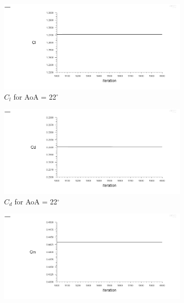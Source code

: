 \begin{figure}[H]
  \begin{subfigure}[b]{0.5\textwidth}
    \includegraphics[width=\textwidth]{22_deg/AoA_22_cl.png}
    \caption{$C_l$ for AoA = 22$^\circ$}
    \label{fig:aoa_22_cl}
  \end{subfigure}
  \hfill
  \begin{subfigure}[b]{0.5\textwidth}
    \includegraphics[width=\textwidth]{22_deg/AoA_22_cd.png}
    \caption{$C_d$ for AoA = 22$^\circ$}
    \label{fig:aoa_22_cd}
  \end{subfigure}
  \begin{subfigure}[b]{0.5\textwidth}
    \includegraphics[width=\textwidth]{22_deg/AoA_22_cm.png}

\end{subfigure}
\end{figure}
